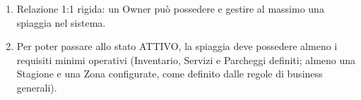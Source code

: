 \documentclass[border=10pt]{standalone}
\begin{document}
	{
		\begin{enumerate}[nosep, leftmargin=*]
			\item[•] Relazione 1:1 rigida: un Owner può possedere e gestire al massimo una spiaggia nel sistema.
			\item[•] Per poter passare allo stato ATTIVO, la spiaggia deve possedere almeno i requisiti minimi operativi (Inventario, Servizi e Parcheggi definiti; almeno una Stagione e una Zona configurate, come definito dalle regole di business generali).
		\end{enumerate}
	}
\end{document}
